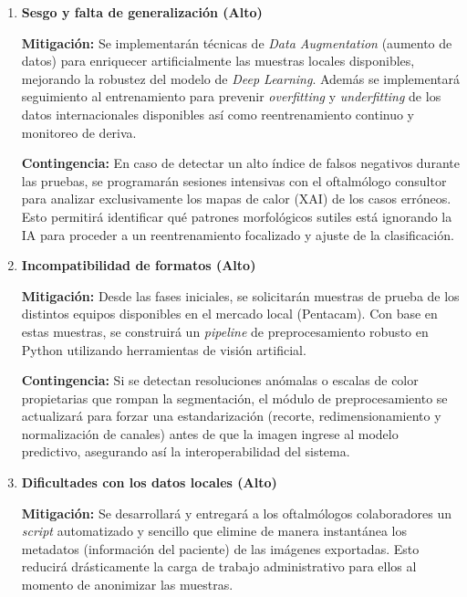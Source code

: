             \begin{enumerate}[label=\textbf{R\arabic* - }] 
            
                \item \textbf{Sesgo y falta de generalización (Alto)}
                
                    \textbf{Mitigación:} Se implementarán técnicas de \textit{Data Augmentation} (aumento de datos) para enriquecer artificialmente las muestras locales disponibles, mejorando la robustez del modelo de \textit{Deep Learning}. Además se implementará seguimiento al entrenamiento para prevenir \textit{overfitting} y \textit{underfitting} de los datos internacionales disponibles así como reentrenamiento continuo y monitoreo de deriva.
    
                    \textbf{Contingencia:} En caso de detectar un alto índice de falsos negativos durante las pruebas, se programarán sesiones intensivas con el oftalmólogo consultor para analizar exclusivamente los mapas de calor (XAI) de los casos erróneos. Esto permitirá identificar qué patrones morfológicos sutiles está ignorando la IA para proceder a un reentrenamiento focalizado y ajuste de la clasificación.
    
                \item \textbf{Incompatibilidad de formatos (Alto)}
    
                    \textbf{Mitigación:} Desde las fases iniciales, se solicitarán muestras de prueba de los distintos equipos disponibles en el mercado local (Pentacam). Con base en estas muestras, se construirá un \textit{pipeline} de preprocesamiento robusto en Python utilizando herramientas de visión artificial.
    
                    \textbf{Contingencia:} Si se detectan resoluciones anómalas o escalas de color propietarias que rompan la segmentación, el módulo de preprocesamiento se actualizará para forzar una estandarización (recorte, redimensionamiento y normalización de canales) antes de que la imagen ingrese al modelo predictivo, asegurando así la interoperabilidad del sistema.
                
                \item \textbf{Dificultades con los datos locales (Alto)}
    
                    \textbf{Mitigación:} Se desarrollará y entregará a los oftalmólogos colaboradores un \textit{script} automatizado y sencillo que elimine de manera instantánea los metadatos (información del paciente) de las imágenes exportadas. Esto reducirá drásticamente la carga de trabajo administrativo para ellos al momento de anonimizar las muestras.
    

\end{enumerate}

